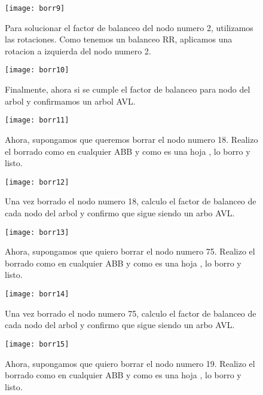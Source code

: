 \documentclass[10pt,a4paper]{article}
\begin{document}
\begin{figure}[h]
	\centering
	\texttt{[image: borr9]}
	\caption{Para solucionar el factor de balanceo del nodo numero 2, utilizamos las rotaciones. Como tenemos un balanceo RR, aplicamos una rotacion a izquierda del nodo numero 2.}
	\label{drivers1}
\end{figure}

\begin{figure}[h]
	\centering
	\texttt{[image: borr10]}
	\caption{Finalmente, ahora si se cumple el factor de balanceo para nodo del arbol y confirmamos un arbol AVL.}
	\label{drivers1}
\end{figure}
\newpage

\begin{figure}[h]
	\centering
	\texttt{[image: borr11]}
	\caption{Ahora, supongamos que queremos borrar el nodo numero 18. Realizo el borrado como en cualquier ABB y como es una hoja , lo borro y listo.}
	\label{drivers1}
\end{figure}

\begin{figure}[h]
	\centering
	\texttt{[image: borr12]}
	\caption{Una vez borrado el nodo numero 18, calculo el factor de balanceo de cada nodo del arbol y confirmo que sigue siendo un arbo AVL. }
	\label{drivers1}
\end{figure}

\begin{figure}[h]
	\centering
	\texttt{[image: borr13]}
	\caption{Ahora, supongamos que quiero borrar el nodo numero 75. Realizo el borrado como en cualquier ABB y como es una hoja , lo borro y listo.}
	\label{drivers1}
\end{figure}
\newpage

\begin{figure}[h]
	\centering
	\texttt{[image: borr14]}
	\caption{Una vez borrado el nodo numero 75, calculo el factor de balanceo de cada nodo del arbol y confirmo que sigue siendo un arbo AVL.}
	\label{drivers1}
\end{figure}

\begin{figure}[h]
	\centering
	\texttt{[image: borr15]}
	\caption{Ahora, supongamos que quiero borrar el nodo numero 19. Realizo el borrado como en cualquier ABB y como es una hoja , lo borro y listo.}
	\label{drivers1}
\end{figure}
\end{document}

